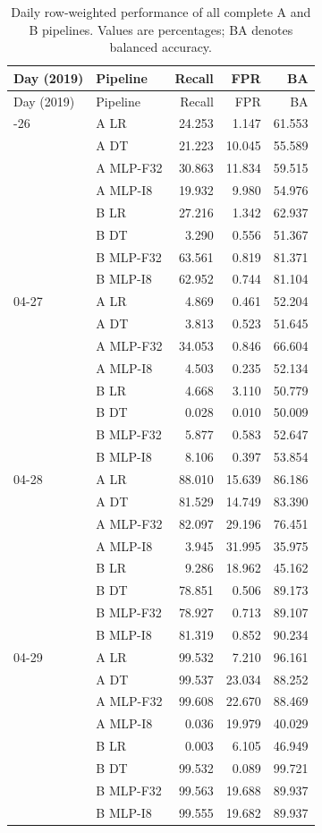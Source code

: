 {\small
\begin{longtable}{llrrr}
\caption{Daily row-weighted performance of all complete A and B pipelines. Values are percentages; BA denotes balanced accuracy.}\label{tab:daily-complete}\\
\toprule
Day (2019) & Pipeline & Recall & FPR & BA \\
\midrule
\endfirsthead
\toprule
Day (2019) & Pipeline & Recall & FPR & BA \\
\midrule
\endhead
\bottomrule
\endfoot
04-26 & A LR & 24.253 & 1.147 & 61.553 \\
 & A DT & 21.223 & 10.045 & 55.589 \\
 & A MLP-F32 & 30.863 & 11.834 & 59.515 \\
 & A MLP-I8 & 19.932 & 9.980 & 54.976 \\
 & B LR & 27.216 & 1.342 & 62.937 \\
 & B DT & 3.290 & 0.556 & 51.367 \\
 & B MLP-F32 & 63.561 & 0.819 & 81.371 \\
 & B MLP-I8 & 62.952 & 0.744 & 81.104 \\
\midrule
04-27 & A LR & 4.869 & 0.461 & 52.204 \\
 & A DT & 3.813 & 0.523 & 51.645 \\
 & A MLP-F32 & 34.053 & 0.846 & 66.604 \\
 & A MLP-I8 & 4.503 & 0.235 & 52.134 \\
 & B LR & 4.668 & 3.110 & 50.779 \\
 & B DT & 0.028 & 0.010 & 50.009 \\
 & B MLP-F32 & 5.877 & 0.583 & 52.647 \\
 & B MLP-I8 & 8.106 & 0.397 & 53.854 \\
\midrule
04-28 & A LR & 88.010 & 15.639 & 86.186 \\
 & A DT & 81.529 & 14.749 & 83.390 \\
 & A MLP-F32 & 82.097 & 29.196 & 76.451 \\
 & A MLP-I8 & 3.945 & 31.995 & 35.975 \\
 & B LR & 9.286 & 18.962 & 45.162 \\
 & B DT & 78.851 & 0.506 & 89.173 \\
 & B MLP-F32 & 78.927 & 0.713 & 89.107 \\
 & B MLP-I8 & 81.319 & 0.852 & 90.234 \\
\midrule
04-29 & A LR & 99.532 & 7.210 & 96.161 \\
 & A DT & 99.537 & 23.034 & 88.252 \\
 & A MLP-F32 & 99.608 & 22.670 & 88.469 \\
 & A MLP-I8 & 0.036 & 19.979 & 40.029 \\
 & B LR & 0.003 & 6.105 & 46.949 \\
 & B DT & 99.532 & 0.089 & 99.721 \\
 & B MLP-F32 & 99.563 & 19.688 & 89.937 \\
 & B MLP-I8 & 99.555 & 19.682 & 89.937 \\
\end{longtable}
}
